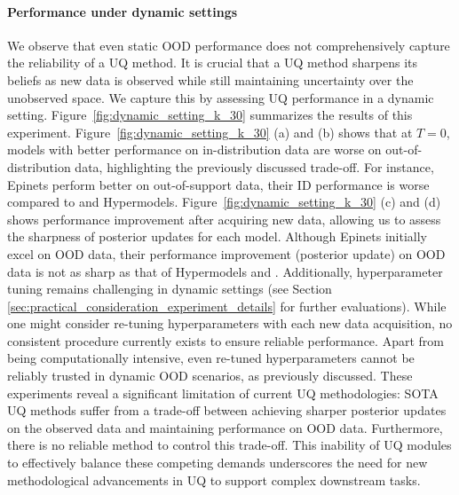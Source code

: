 \paragraph{Performance under dynamic settings} We observe that even static OOD performance does not comprehensively capture the reliability of a UQ method. 
It is crucial that a UQ method  sharpens its beliefs as new data is observed while  still maintaining uncertainty over the unobserved space.  We capture this by assessing UQ performance in  a  dynamic setting. 
Figure~\ref{fig:dynamic_setting_k_30} summarizes  the results of this experiment. 
Figure~\ref{fig:dynamic_setting_k_30} (a) and (b)  shows that at $T=0$, models with better performance on in-distribution data are worse on 
out-of-distribution data, highlighting the previously discussed trade-off. For instance, Epinets perform better on out-of-support data, their ID performance is worse compared to \ensembleplus and Hypermodels. Figure~\ref{fig:dynamic_setting_k_30} (c) and (d)  shows performance improvement after acquiring new data, allowing us to assess the sharpness of posterior updates for each model. 
Although Epinets initially excel on OOD data, their performance improvement (posterior update) on OOD data is not as sharp as that of Hypermodels and \ensembleplus. Additionally, hyperparameter tuning remains challenging in dynamic settings (see Section \ref{sec:practical_consideration_experiment_details} for further evaluations). While one might consider re-tuning hyperparameters with each new data acquisition, no consistent procedure currently exists to ensure reliable performance. Apart from being computationally intensive, even re-tuned hyperparameters cannot be reliably trusted in dynamic OOD scenarios, as previously discussed. These experiments reveal a significant limitation of current UQ methodologies: SOTA UQ methods suffer from a trade-off between achieving sharper posterior updates on the observed data and maintaining performance on OOD data. Furthermore, there is no reliable method to control this trade-off. This inability of UQ modules to effectively balance these competing demands underscores the need for new methodological advancements in UQ to support complex downstream tasks.





